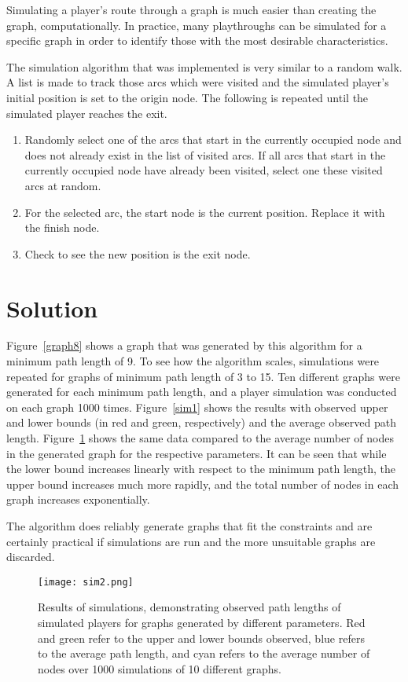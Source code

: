 \documentclass[landscape, a0, final]{a0poster}
\begin{document}
\begin{minipage}{0.20\linewidth}

    Simulating a player's route through a graph is much easier than creating the graph, computationally.  In practice, many playthroughs can be simulated for a specific graph in order to identify those with the most desirable characteristics.  

The simulation algorithm that was implemented is very similar to a random walk.  A list is made to track those arcs which were visited and the simulated player's initial position is set to the origin node.  The following is repeated until the simulated player reaches the exit.
    \begin{enumerate} 
        \item Randomly select one of the arcs that start in the currently occupied node and does not already exist in the list of visited arcs.  If all arcs that start in the currently occupied node have already been visited, select one these visited arcs at random.  
        \item For the selected arc, the start node is the current position.  Replace it with the finish node.
        \item Check to see the new position is the exit node.
    \end{enumerate} 

    \section{Solution} 

    Figure~\ref{graph8} shows a graph that was generated by this algorithm for a minimum path length of 9.  To see how the algorithm scales, simulations were repeated for graphs of minimum path length of 3 to 15.  Ten different graphs were generated for each minimum path length, and a player simulation was conducted on each graph 1000 times.  Figure~\ref{sim1} shows the results with observed upper and lower bounds (in red and green, respectively) and the average observed path length.  Figure~\ref{sim2} shows the same data compared to the average number of nodes in the generated graph for the respective parameters.  It can be seen that while the lower bound increases linearly with respect to the minimum path length, the upper bound increases much more rapidly, and the total number of nodes in each graph increases exponentially.

The algorithm does reliably generate graphs that fit the constraints and are certainly practical if simulations are run and the more unsuitable graphs are discarded.

\centering 
        \begin{figure}[H]
            \texttt{[image: sim2.png]} 
            \caption{Results of simulations, demonstrating observed path lengths of simulated players for graphs generated by different parameters.  Red and green refer to the upper and lower bounds observed, blue refers to the average path length, and cyan refers to the average number of nodes over 1000 simulations of 10 different graphs.} 
            \label{sim2}
        \end{figure}


\end{minipage} 
\end{document}
